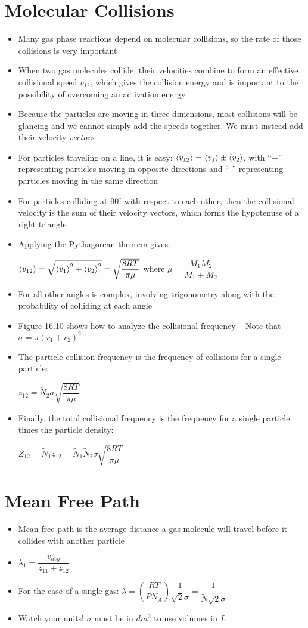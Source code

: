 \documentclass[12pt, openany, letterpaper]{memoir}
\begin{document}
\section*{Molecular Collisions}
\begin{itemize}
	\item Many gas phase reactions depend on molecular collisions, so the rate of those collisions is very important
	\item When two gas molecules collide, their velocities combine to form an effective collisional speed $v_{12}$, which gives the collision energy and is important to the possibility of overcoming an activation energy
	\item Because the particles are moving in three dimensions, most collisions will be glancing and we cannot simply add the speeds together. We must instead add their velocity \emph{vectors}
	\item For particles traveling on a line, it is easy: $\left< v_{12} \right>=\left< v_1 \right>\pm\left< v_2 \right>$, with ``+'' representing particles moving in opposite directions and ``-'' representing particles moving in the same direction
	\item For particles colliding at $90^\circ$ with respect to each other, then the collisional velocity is the sum of their velocity vectors, which forms the hypotenuse of a right triangle
	\item Applying the Pythagorean theorem gives:
	
	$\left< v_{12} \right> = \sqrt{\left< v_1 \right>^2+\left< v_2 \right>^2} = \sqrt{\dfrac{8RT}{\pi\mu}}$ where $\mu=\dfrac{M_1M_2}{M_1+M_2}$
	\item For all other angles is complex, involving trigonometry along with the probability of colliding at each angle
	\item Figure 16.10 shows how to analyze the collisional frequency -- Note that $\sigma = \pi(r_1+r_2)^2$
	\item The particle collision frequency is the frequency of collisions for a single particle:
	
	$z_{12}=\tilde{N}_2\sigma\sqrt{\dfrac{8RT}{\pi\mu}}$
	\item Finally, the total collisional frequency is the frequency for a single particle times the particle density:
	
	$Z_{12} = \tilde{N}_1z_{12} = \tilde{N}_1\tilde{N}_2\sigma\sqrt{\dfrac{8RT}{\pi\mu}}$
\end{itemize}
\section*{Mean Free Path}
\begin{itemize}
	\item Mean free path is the average distance a gas molecule will travel before it collides with another particle
	\item $\lambda_1 = \dfrac{v_{avg}}{z_{11}+z_{12}}$
	\item For the case of a single gas: $\lambda = \left(\dfrac{RT}{PN_A}\right)\dfrac{1}{\sqrt{2}\sigma}=\dfrac{1}{\tilde{N}\sqrt{2}\sigma}$ \item Watch your units! $\sigma$ must be in $dm^2$ to use volumes in $L$
\end{itemize}
\end{document}
